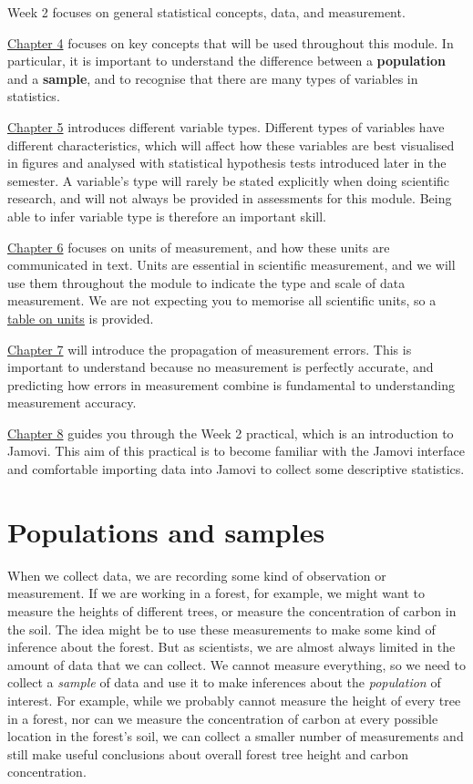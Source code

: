 \documentclass[
]{scrbook}
\begin{document}
Week 2 focuses on general statistical concepts, data, and measurement.

\protect\hyperlink{Chapter_4}{Chapter 4} focuses on key concepts that will be used throughout this module.
In particular, it is important to understand the difference between a \textbf{population} and a \textbf{sample}, and to recognise that there are many types of variables in statistics.

\protect\hyperlink{Chapter_5}{Chapter 5} introduces different variable types. Different types of variables have different characteristics, which will affect how these variables are best visualised in figures and analysed with statistical hypothesis tests introduced later in the semester.
A variable's type will rarely be stated explicitly when doing scientific research, and will not always be provided in assessments for this module.
Being able to infer variable type is therefore an important skill.

\protect\hyperlink{Chapter_6}{Chapter 6} focuses on units of measurement, and how these units are communicated in text.
Units are essential in scientific measurement, and we will use them throughout the module to indicate the type and scale of data measurement.
We are not expecting you to memorise all scientific units, so a \protect\hyperlink{appendixA_units}{table on units} is provided.

\protect\hyperlink{Chapter_7}{Chapter 7} will introduce the propagation of measurement errors.
This is important to understand because no measurement is perfectly accurate, and predicting how errors in measurement combine is fundamental to understanding measurement accuracy.

\protect\hyperlink{Chapter_8}{Chapter 8} guides you through the Week 2 practical, which is an introduction to Jamovi.
This aim of this practical is to become familiar with the Jamovi interface and comfortable importing data into Jamovi to collect some descriptive statistics.

\hypertarget{Chapter_4}{%
\chapter{Populations and samples}\label{Chapter_4}}

When we collect data, we are recording some kind of observation or measurement.
If we are working in a forest, for example, we might want to measure the heights of different trees, or measure the concentration of carbon in the soil.
The idea might be to use these measurements to make some kind of inference about the forest.
But as scientists, we are almost always limited in the amount of data that we can collect.
We cannot measure everything, so we need to collect a \emph{sample} of data and use it to make inferences about the \emph{population} of interest.
For example, while we probably cannot measure the height of every tree in a forest, nor can we measure the concentration of carbon at every possible location in the forest's soil, we can collect a smaller number of measurements and still make useful conclusions about overall forest tree height and carbon concentration.
\end{document}
